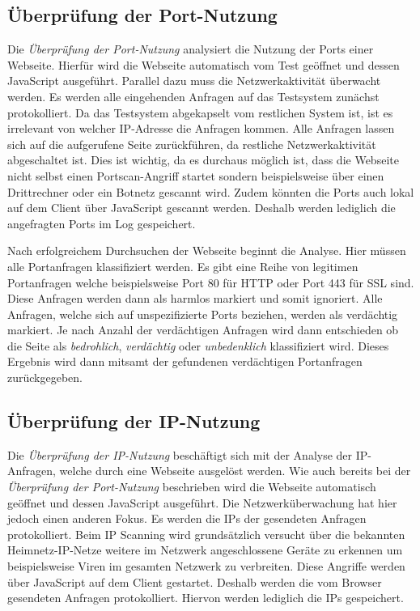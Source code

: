 \subsection{Überprüfung der Port-Nutzung}
Die \textit{Überprüfung der Port-Nutzung} analysiert die Nutzung der Ports einer Webseite. Hierfür
wird die Webseite automatisch vom Test geöffnet und dessen JavaScript ausgeführt. Parallel dazu muss die
Netzwerkaktivität überwacht werden. Es werden alle eingehenden Anfragen auf das Testsystem zunächst
protokolliert. Da das Testsystem abgekapselt vom restlichen System ist, ist es irrelevant von
welcher IP-Adresse die Anfragen kommen. Alle Anfragen lassen sich auf die aufgerufene Seite
zurückführen, da restliche Netzwerkaktivität abgeschaltet ist. Dies ist wichtig, da es durchaus
möglich ist, dass die Webseite nicht selbst einen Portscan-Angriff startet sondern beispielsweise
über einen Drittrechner oder ein Botnetz gescannt wird. Zudem könnten die Ports auch lokal auf dem
Client über JavaScript gescannt werden. Deshalb werden lediglich die angefragten Ports im Log
gespeichert.

Nach erfolgreichem Durchsuchen der Webseite beginnt die Analyse. Hier müssen alle Portanfragen
klassifiziert werden. Es gibt eine Reihe von legitimen Portanfragen welche beispielsweise Port 80
für \acs{HTTP} oder Port 443 für \acs{SSL} sind. Diese Anfragen werden dann als harmlos markiert und
somit ignoriert. Alle Anfragen, welche sich auf unspezifizierte Ports beziehen, werden als
verdächtig markiert. Je nach Anzahl der verdächtigen Anfragen wird dann entschieden ob die Seite
als \textit{bedrohlich}, \textit{verdächtig} oder \textit{unbedenklich} klassifiziert wird. Dieses
Ergebnis wird dann mitsamt der gefundenen verdächtigen Portanfragen zurückgegeben.

\subsection{Überprüfung der IP-Nutzung}
Die \textit{Überprüfung der IP-Nutzung} beschäftigt sich mit der Analyse der IP-Anfragen, welche
durch eine Webseite ausgelöst werden. Wie auch bereits bei der \textit{Überprüfung der Port-Nutzung}
beschrieben wird die Webseite automatisch geöffnet und dessen JavaScript ausgeführt. Die
Netzwerküberwachung hat hier jedoch einen anderen Fokus. Es werden die IPs der gesendeten Anfragen
protokolliert. Beim IP Scanning wird grundsätzlich versucht über die bekannten Heimnetz-IP-Netze
weitere im Netzwerk angeschlossene Geräte zu erkennen um beispielsweise Viren im gesamten Netzwerk
zu verbreiten. Diese Angriffe werden über JavaScript auf dem Client gestartet. Deshalb werden die
vom Browser gesendeten Anfragen protokolliert. Hiervon werden lediglich die IPs gespeichert.

